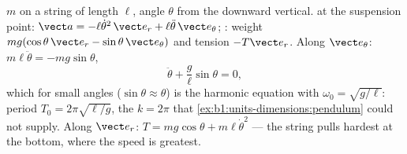 \begin{example}\label{ex:b1:newton-dynamics:pendulum}
 $m$ on a string of length $\ell$, angle $\theta$ from the downward
vertical.  at the suspension point: $\vect a =
-\ell\dot\theta^2\,\vect e_r + \ell\ddot\theta\,\vect e_\theta$; :
weight $mg(\cos\theta\,\vect e_r - \sin\theta\,\vect e_\theta)$ and
tension $-T\vect e_r$. Along $\vect e_\theta$: $m\ell\ddot\theta =
-mg\sin\theta$,
\[
\ddot\theta + \frac{g}{\ell}\sin\theta = 0 ,
\]
which for small angles ($\sin\theta \approx \theta$) is the harmonic
equation with $\omega_0 = \sqrt{g/\ell}$: period $T_0 = 2\pi\sqrt{\ell/g}$,
the $k = 2\pi$ that \cref{ex:b1:units-dimensions:pendulum} could not
supply. Along $\vect e_r$: $T = mg\cos\theta + m\ell\dot\theta^2$ --- the
string pulls hardest at the bottom, where the speed is greatest.
\end{example}

